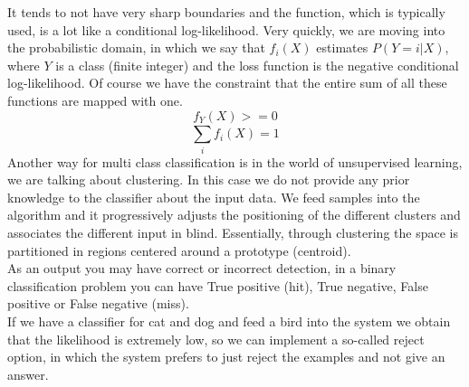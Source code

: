 It tends to not have very sharp boundaries and the function, which is typically used, is a lot like a conditional log-likelihood.
Very quickly, we are moving into the probabilistic domain, in which we say that $f_i(X)$ estimates $P(Y=i|X)$, where $Y$ is a class (finite integer) and the loss function is the negative conditional log-likelihood.
Of course we have the constraint that the entire sum of all these functions are mapped with one. \[f_Y(X)>= 0\] \[\sum_{i}^{}f_i(X)=1\] 
Another way for multi class classification is in the world of unsupervised learning, we are talking about clustering. In this case we do not provide any prior knowledge to the classifier about the input data.
We feed samples into the algorithm and it progressively adjusts the positioning of the different clusters and associates the different input in blind. Essentially, through clustering the space is partitioned in regions centered around a prototype (centroid).
\\
As an output you may have correct or incorrect detection, in a binary classification problem you can have True positive (hit), True negative, False positive or False negative (miss).
\\
If we have a classifier for cat and dog and feed a bird into the system we obtain that the likelihood is extremely low, so we can implement a so-called reject option, in which the system prefers to just reject the examples and not give an answer. 
